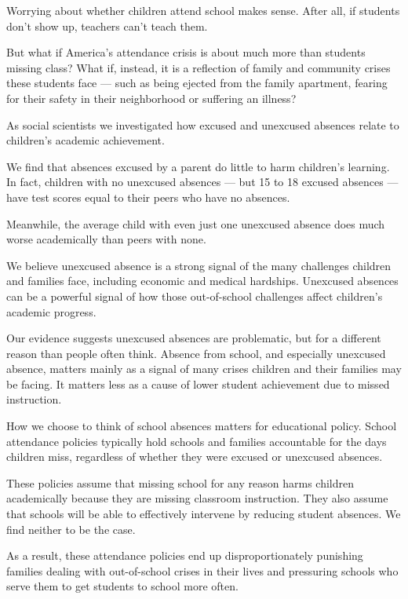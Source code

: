 \documentclass[UTF8,11pt]{ctexart}
\begin{document}
Worrying about whether children attend school makes sense. After all, if students don’t show up, teachers can’t teach them.


But what if America’s attendance crisis is about much more than students missing class? What if, instead, it is a reflection of family and community crises these students face — such as being ejected from the family apartment, fearing for their safety in their neighborhood or suffering an illness?


As social scientists we investigated how excused and unexcused absences relate to children’s academic achievement.


We find that absences excused by a parent do little to harm children’s learning. In fact, children with no unexcused absences — but 15 to 18 excused absences — have test scores equal to their peers who have no absences.


Meanwhile, the average child with even just one unexcused absence does much worse academically than peers with none.


We believe unexcused absence is a strong signal of the many challenges children and families face, including economic and medical hardships. Unexcused absences can be a powerful signal of how those out-of-school challenges affect children’s academic progress.


Our evidence suggests unexcused absences are problematic, but for a different reason than people often think. Absence from school, and especially unexcused absence, matters mainly as a signal of many crises children and their families may be facing. It matters less as a cause of lower student achievement due to missed instruction.


How we choose to think of school absences matters for educational policy. School attendance policies typically hold schools and families accountable for the days children miss, regardless of whether they were excused or unexcused absences.


These policies assume that missing school for any reason harms children academically because they are missing classroom instruction. They also assume that schools will be able to effectively intervene by reducing student absences. We find neither to be the case.


As a result, these attendance policies end up disproportionately punishing families dealing with out-of-school crises in their lives and pressuring schools who serve them to get students to school more often.
\end{document}
